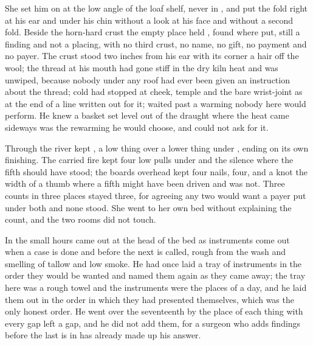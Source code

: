 She set him on  at the low angle of the loaf shelf, never in , and put the fold right at his ear and under his chin without a look at his face and without a second fold. Beside the horn-hard crust the empty place held , found where put, still a finding and not a placing, with no third crust, no name, no gift, no payment and no payer. The crust stood two inches from his ear with its corner a hair off the wool; the thread at his mouth had gone stiff in the dry kiln heat and was unwiped, because nobody under any roof had ever been given an instruction about the thread; cold had stopped at cheek, temple and the bare wrist-joint as at the end of a line written out for it;  waited past a warming nobody here would perform. He knew a basket set level out of the draught where the heat came sideways was the rewarming he would choose, and could not ask for it.

Through  the river kept , a low thing over a lower thing under , ending on its own finishing. The carried fire kept four low pulls under  and the silence where the fifth should have stood; the boards overhead kept four nails, four, and a knot the width of a thumb where a fifth might have been driven and was not. Three counts in three places stayed three, for agreeing any two would want a payer put under both and none stood. She went to her own bed without explaining the count, and the two rooms did not touch.

\scenebreak

In the small hours  came out at the head of the bed as instruments come out when a case is done and before the next is called, rough from the wash and smelling of tallow and low smoke. He had once laid a tray of instruments in the order they would be wanted and named them again as they came away; the tray here was a rough towel and the instruments were the places of a day, and he laid them out in the order in which they had presented themselves, which was the only honest order. He went over the seventeenth by the place of each thing with every gap left a gap, and he did not add them, for a surgeon who adds findings before the last is in has already made up his answer.

